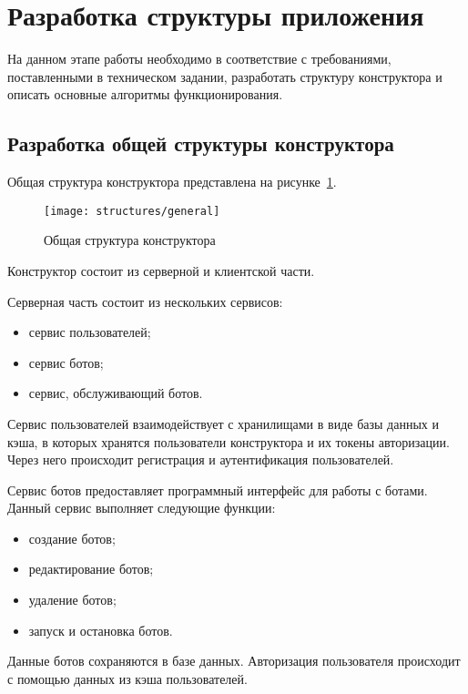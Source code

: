 
\newpage

\section{Разработка структуры приложения}

На данном этапе работы необходимо в соответствие с требованиями,
поставленными в техническом задании, разработать структуру конструктора
и описать основные алгоритмы функционирования.

\subsection{Разработка общей структуры конструктора }

Общая структура конструктора представлена на рисунке~\ref{f:general-struct}.

\begin{figure}[ht]
	\centering
	\texttt{[image: structures/general]}
	\caption{Общая структура конструктора}
	\label{f:general-struct}
\end{figure}


Конструктор состоит из серверной и клиентской части.

Серверная часть состоит из нескольких сервисов:
\begin{itemize}
	\item сервис пользователей;
	\item сервис ботов;
	\item сервис, обслуживающий ботов.
\end{itemize}

Сервис пользователей взаимодействует с хранилищами в виде базы
данных и кэша, в которых хранятся пользователи конструктора и их токены
авторизации. Через него происходит регистрация и аутентификация
пользователей.

Сервис ботов предоставляет программный интерфейс для работы с
ботами. Данный сервис выполняет следующие функции:
\begin{itemize}
	\item создание ботов;
	\item редактирование ботов;
	\item удаление ботов;
	\item запуск и остановка ботов.
\end{itemize}

Данные ботов сохраняются в базе данных. Авторизация пользователя
происходит с помощью данных из кэша пользователей.

